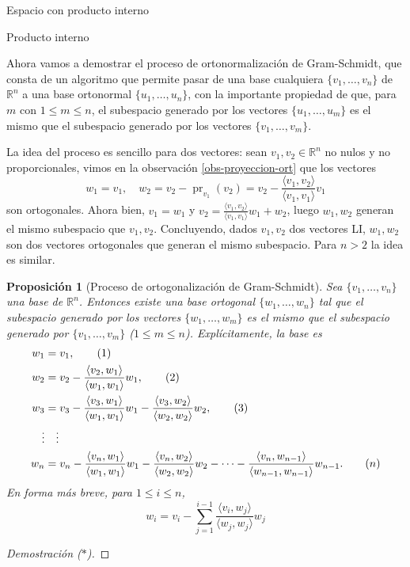 \documentclass[a4paper,12pt,twoside,spanish,reqno]{amsbook}
\newtheorem{proposicion}[teorema]{Proposici\'on}
\theoremstyle{definition}
\theoremstyle{remark}
\newcommand{\la}{\langle}
\newcommand{\ra}{\rangle}
\newcommand{\R}{\mathbb R}
\begin{document}
\begin{chapter}{Espacio con producto interno}
\begin{section}{Producto interno}
		
		\medskip
		
		Ahora vamos a demostrar el proceso de ortonormalización de Gram-Schmidt, que consta de  un algoritmo que permite pasar de una base cualquiera $\{v_1,\ldots, v_n\}$ de $\R^n$ a una base ortonormal $\{u_1,\ldots, u_n\}$, con la importante propiedad de que, para $m$ con  $1 \le m \le n$, el subespacio generado por los vectores $\{u_1,\ldots, u_m\}$ es el mismo que el subespacio generado por los vectores $\{v_1,\ldots, v_m\}$.
		
	
		
		\medskip 
		
		La idea del proceso es sencillo para dos vectores: sean  $v_1,v_2 \in \R^n$ no  nulos y no proporcionales, vimos en la observación \ref{obs-proyeccion-ort} que  los vectores
		\begin{equation*}
			w_1 = v_1, \quad w_2 = v_2 - \operatorname{pr}_{v_1}(v_2) = v_2 - \frac{\la v_1,v_2\ra}{\la v_1,v_1\ra}v_1
		\end{equation*}
		son ortogonales. Ahora bien, $v_1 = w_1$ y $v_2  = \frac{\la v_1,v_2\ra}{\la v_1,v_1\ra}w_1 + w_2$, luego  $w_1,w_2$ generan el mismo subespacio que $v_1,v_2$. Concluyendo, dados  $v_1,v_2$ dos vectores LI, $w_1,w_2$ son dos vectores ortogonales que generan el mismo subespacio. Para $n >2$ la idea es similar. 
		
		\medskip 
		
		
		
		\begin{proposicion}[Proceso de ortogonalización de Gram-Schmidt]
			Sea $\{v_1,\ldots,v_n\}$ una base de $\R^n$. Entonces existe una base ortogonal $\{w_1,\ldots, w_n\}$ tal que el subespacio generado por los vectores $\{w_1,\ldots, w_m\}$ es el mismo que el subespacio generado por $\{v_1,\ldots, v_m\}$ ($1\le m \le n$). Explícitamente, la base es
			\begin{align}
			w_1 &= v_1, \tag{1} \\
			w_2 &= v_2 - \frac{\la v_2,w_1\ra}{\la w_1,w_1\ra}w_1, \tag{2}\\
			w_3 &= v_3 - \frac{\la v_3,w_1\ra}{\la w_1,w_1\ra}w_1- \frac{\la v_3,w_2\ra}{\la w_2,w_2\ra}w_2,\tag{3} \\
			\vdots &\quad \vdots \notag \\
			w_n &= v_n - \frac{\la v_n,w_1\ra}{\la w_1,w_1\ra}w_1- \frac{\la v_n,w_2\ra}{\la w_2,w_2\ra}w_2 - \cdots - \frac{\la v_n,w_{n-1}\ra}{\la w_{n-1},w_{n-1}\ra}w_{n-1}.\tag{$n$}	
			\end{align}
			En forma más breve, para $1 \le i \le n$, 
			\begin{equation}
			w_i = v_i - \sum_{j = 1}^{i-1} \frac{\la v_i,w_{j}\ra}{\la w_{j},w_{j}\ra}w_{j} \tag{$i$}
			\end{equation}
		\end{proposicion} 
		\begin{proof}[Demostración ($*$)]
			

\end{proof}
\end{section}
\end{chapter}
\end{document}
